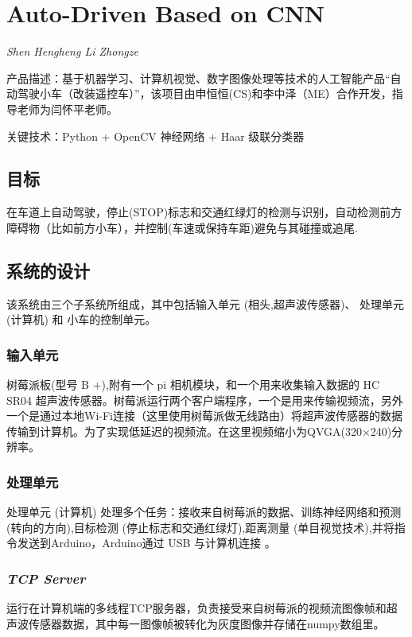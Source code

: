 \documentclass[UTF8,a4paper,cs4size]{ctexart}
\begin{document}


\section*{Auto-Driven Based on CNN}
\begin{center}
\textit{Shen Hengheng \hspace{10mm} Li Zhongze}
\end{center}
\noindent 产品描述：基于机器学习、计算机视觉、数字图像处理等技术的人工智能产品“自动驾驶小车（改装遥控车）”，该项目由申恒恒(CS)和李中泽（ME）合作开发，指导老师为闫怀平老师。

\noindent 关键技术：Python + OpenCV 神经网络 + Haar 级联分类器
\subsection*{目标}
在车道上自动驾驶，停止(STOP)标志和交通红绿灯的检测与识别，自动检测前方障碍物（比如前方小车），并控制(车速或保持车距)避免与其碰撞或追尾.
\subsection*{系统的设计}
该系统由三个子系统所组成，其中包括输入单元 (相头,超声波传感器)、 处理单元 (计算机) 和 小车的控制单元。
\subsubsection*{输入单元}
树莓派板(型号 B +),附有一个 pi 相机模块，和一个用来收集输入数据的 HC SR04 超声波传感器。树莓派运行两个客户端程序，一个是用来传输视频流，另外一个是通过本地Wi-Fi连接（这里使用树莓派做无线路由）将超声波传感器的数据传输到计算机。为了实现低延迟的视频流。在这里视频缩小为QVGA(320×240)分辨率。
\subsubsection*{处理单元}
处理单元 (计算机) 处理多个任务：接收来自树莓派的数据、训练神经网络和预测(转向的方向),目标检测 (停止标志和交通红绿灯),距离测量 (单目视觉技术),并将指令发送到Arduino，Arduino通过 USB 与计算机连接 。
\subsubsection*{\textit{TCP Server}}
运行在计算机端的多线程TCP服务器，负责接受来自树莓派的视频流图像帧和超声波传感器数据，其中每一图像帧被转化为灰度图像并存储在numpy数组里。
\end{document}
